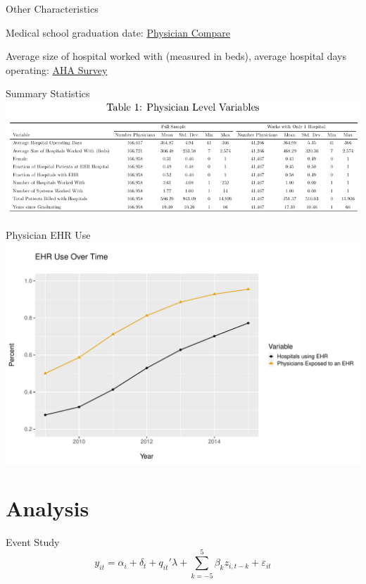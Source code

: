 \documentclass[10pt]{beamer}
\begin{document}
\begin{frame}{Other Characteristics}

Medical school graduation date: \underline{Physician Compare}

\vspace{5mm}

Average size of hospital worked with (measured in beds), average hospital days operating: \underline{AHA Survey}
\end{frame}

\begin{frame}{Summary Statistics}
\centering
    \includegraphics[scale=.8]{Objects/sumstats.pdf}
    
\end{frame}

\begin{frame}{Physician EHR Use}
    \centering
    \includegraphics[scale=.5]{Objects/sum_stats_year.pdf}
\end{frame}


\section{Analysis}

\begin{frame}{Event Study}
\begin{equation*}
    y_{it}=\alpha_i+\delta_t+q_{it}'\lambda+\sum_{k=-5}^5 \beta_kz_{i,t-k} + \varepsilon_{it}
\end{equation*}

    
\end{frame}
\end{document}
